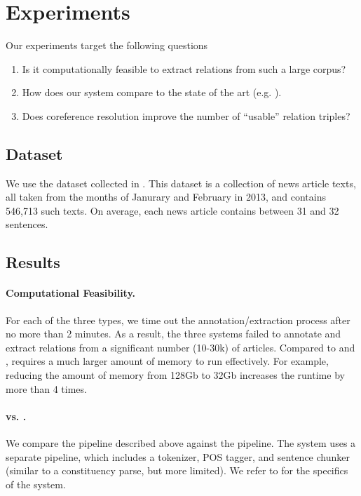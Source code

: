 \section{Experiments}

Our experiments target the following questions
\begin{enumerate}
\item Is it computationally feasible to extract relations from 
  such a large corpus?
\item How does our system compare to the state of the art (e.g. \reverb).
\item Does coreference resolution improve the number of 
  ``usable'' relation triples?
\end{enumerate}

\subsection{Dataset}
We use the \newsspike{} dataset collected in \citet{zhang2013parallelparaphrase}.
This dataset is a collection of news article texts, all taken from the months of
Janurary and February in 2013, and contains 546,713 such texts. On average,
each news article contains between 31 and 32 sentences.

\subsection{Results}



 







\paragraph{Computational Feasibility.}
For each of the three types, we time out
the annotation/extraction process after no more than
2 minutes. As a result, the three systems failed to
annotate and extract relations from 
a significant number (10-30k) of articles. Compared to
\reverb{} and \openie{}, \openiecoref{} requires a much 
larger amount of memory to run effectively. For
example, reducing the amount of memory from 128Gb to
32Gb increases the runtime by more than 4 times.

\paragraph{\openie{} vs. \reverb.}
We compare the \openie{} pipeline described above
against the \reverb{} pipeline. The \reverb{} system uses 
a separate pipeline, which includes a tokenizer, POS tagger,
and sentence chunker (similar to a constituency parse, but 
more limited). 
We refer to \citet{fader11reverb} for
the specifics of the \reverb{} system.

